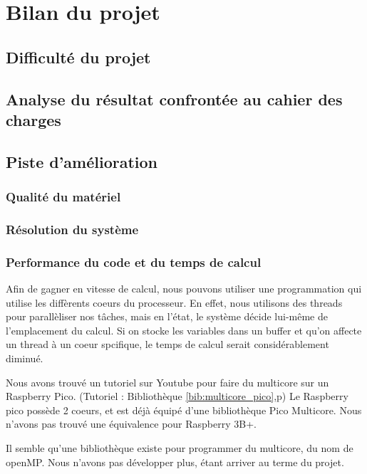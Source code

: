 \documentclass[a4paper]{report}
\begin{document}
    \chapter{Bilan du projet}

        \section{Difficulté du projet}
        \section{Analyse du résultat confrontée au cahier des charges}
        \section{Piste d'amélioration}
            \subsection{Qualité du matériel}
            \subsection{Résolution du système}
            
            \subsection{Performance du code et du temps de calcul}
            
            Afin de gagner en vitesse de calcul, nous pouvons utiliser une programmation qui utilise
    les diffèrents coeurs du processeur. En effet, nous utilisons des threads pour parallèliser
    nos t\^{a}ches, mais en l'état, le système décide lui-m\^{e}me de l'emplacement du calcul.
    Si on stocke les variables dans un buffer et qu'on affecte un thread à un coeur spcifique, 
    le temps de calcul serait considérablement diminué. 
    
    Nous avons trouvé un tutoriel sur Youtube pour faire du multicore sur un Raspberry Pico.
    (Tutoriel : Bibliothèque \ref{bib:multicore_pico},p\pageref{bib:multicore_pico})
    Le Raspberry pico possède 2 coeurs, et est déjà équipé d'une bibliothèque Pico Multicore.
    Nous n'avons pas trouvé une équivalence pour Raspberry 3B+. 

    Il semble qu'une bibliothèque existe pour programmer du multicore, du nom de openMP. 
    Nous n'avons pas développer plus, étant arriver au terme du projet.
    
\end{document}
